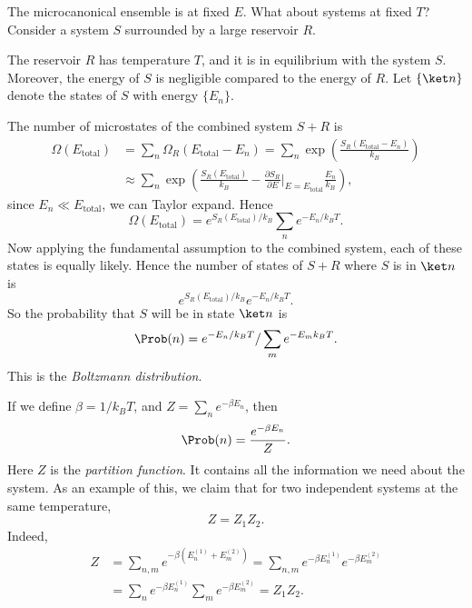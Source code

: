 \documentclass[12pt]{article}
\begin{document}
The microcanonical ensemble is at fixed $E$. What about systems at fixed $T$? Consider a system $S$ surrounded by a large reservoir $R$.

The reservoir $R$ has temperature $T$, and it is in equilibrium with the system $S$. Moreover, the energy of $S$ is negligible compared to the energy of $R$. Let $\{\ket n\}$ denote the states of $S$ with energy $\{E_n\}$.

The number of microstates of the combined system $S + R$ is
\begin{align*}
	\Omega(E_{\mathrm{total}}) &= \sum_n \Omega_R(E_{\mathrm{total}} - E_n) = \sum_n \exp \left( \frac{S_R(E_{\mathrm{total}} - E_n)}{k_B} \right) \\
				   &\approx \sum_n \exp \left( \frac{S_R(E_{\mathrm{total}})}{k_B} - \frac{\partial S_R}{\partial E}\biggr|_{E = E_{\mathrm{total}}} \! \! \frac{E_n}{k_B} \right),
\end{align*} 
since $E_n \ll E_{\mathrm{total}}$, we can Taylor expand. Hence
\[
\Omega(E_{\mathrm{total}}) = e^{S_R(E_{\mathrm{total}})/k_B} \sum_n e^{-E_n/ k_B T}.
\]
Now applying the fundamental assumption to the combined system, each of these states is equally likely. Hence the number of states of $S + R$ where $S$ is in $\ket n$ is
\[
e^{S_R(E_{\mathrm{total}})/k_B} e^{-E_n/ k_B T}.
\]
So the probability that $S$ will be in state $\ket n$ is
\[
\Prob(n) = e^{-E_n / k_B T} / \sum_m e^{-E_m k_B T}.
\]
This is the \emph{Boltzmann distribution}.


If we define $\beta = 1/k_B T$, and $Z = \sum_n e^{-\beta E_n}$, then
\[
\Prob(n) = \frac{e^{-\beta E_n}}{Z}.
\]
Here $Z$ is the \emph{partition function}. It contains all the information we need about the system. As an example of this, we claim that for two independent systems at the same temperature,
\[
Z = Z_1 Z_2.
\]
Indeed,
\begin{align*}
	Z &= \sum_{n, m} e^{-\beta(E_n^{(1)} + E_m^{(2)})} = \sum_{n, m} e^{-\beta E_n^{(1)}} e^{-\beta E_m^{(2)}} \\
	  &= \sum_n e^{-\beta E_n^{(1)}} \sum_{m} e^{-\beta E_m^{(2)}} = Z_1 Z_2.
\end{align*}
\end{document}
